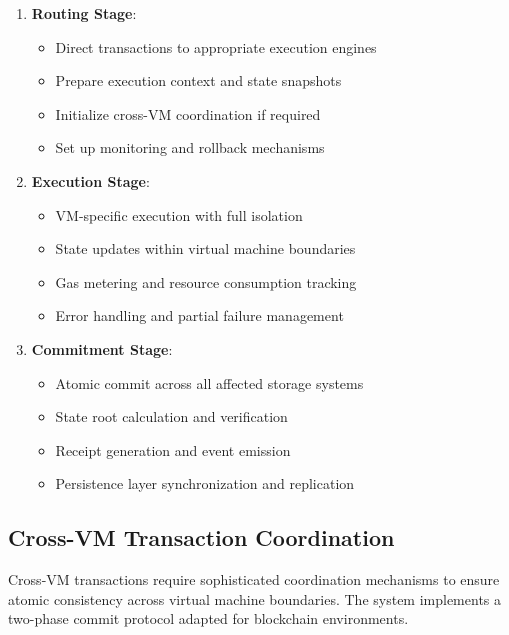 \documentclass[11pt,a4paper]{article}
\begin{document}
\begin{enumerate}
    \item \textbf{Routing Stage}: 
    \begin{itemize}
        \item Direct transactions to appropriate execution engines
        \item Prepare execution context and state snapshots
        \item Initialize cross-VM coordination if required
        \item Set up monitoring and rollback mechanisms
    \end{itemize}
    
    \item \textbf{Execution Stage}: 
    \begin{itemize}
        \item VM-specific execution with full isolation
        \item State updates within virtual machine boundaries
        \item Gas metering and resource consumption tracking
        \item Error handling and partial failure management
    \end{itemize}
    
    \item \textbf{Commitment Stage}: 
    \begin{itemize}
        \item Atomic commit across all affected storage systems
        \item State root calculation and verification
        \item Receipt generation and event emission
        \item Persistence layer synchronization and replication
    \end{itemize}
\end{enumerate}

\subsection{Cross-VM Transaction Coordination}

Cross-VM transactions require sophisticated coordination mechanisms to ensure atomic consistency across virtual machine boundaries. The system implements a two-phase commit protocol adapted for blockchain environments.
\end{document}

